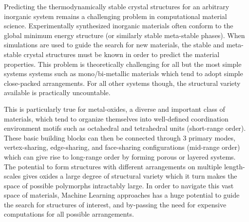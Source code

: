 

Predicting the thermodynamically stable crystal structures for an arbitrary inorganic system remains a challenging problem in computational material science.
%
Experimentally synthesized inorganic materials often conform to the global minimum energy structure (or similarly stable meta-stable phases). When simulations are used to guide the search  for new materials, the stable and meta-stable crystal structures must be known in order to predict the material properties.
%
This problem is theoretically challenging for all but the most simple systems systems such as mono/bi-metallic materials which tend to adopt simple close-packed arrangements.
%
For all other systems though, the structural variety available is practically uncountable.


This is particularly true for metal-oxides, a diverse and important class of materials, which tend to organize themselves into well-defined coordination environment motifs such as octahedral and tetrahedral units (short-range order).
%
These basic building blocks can then be connected through 3 primary modes, vertex-sharing, edge-sharing, and face-sharing configurations (mid-range order) which can give rise to long-range order by forming porous or layered systems.
%
The potential to form structures with different arrangements on multiple length-scales gives oxides a large degree of structural variety which it turn makes the space of possible polymorphs intractably large.
In order to navigate this vast space of materials, Machine Learning approaches has a huge potential to guide the search for structures of interest, and by-passing the need for expensive computations for all possible arrangements. 

